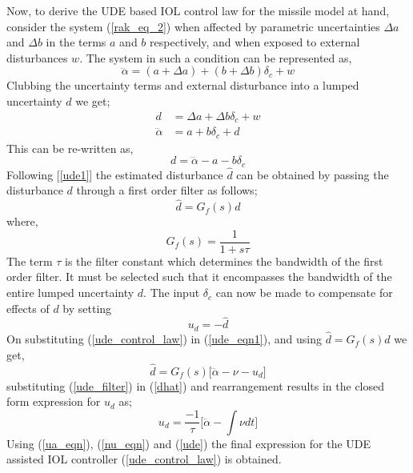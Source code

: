 \documentclass[conference]{IEEEtran}
\begin{document}
		Now, to derive the UDE based IOL control law for the missile model at hand, consider the system (\ref{rak_eq_2}) when affected by parametric uncertainties $\Delta a$ and $\Delta b$ in the terms $a$ and $b$ respectively, and when exposed to external disturbances $w$. The system in such a condition can be represented as,
		\begin{equation}
			\dddot{\alpha}=(a + \Delta a) + (b + \Delta b)\delta_c + w \nonumber
		\end{equation}
		Clubbing the uncertainty terms and external disturbance into a lumped uncertainty $d$ we get;
		\begin{equation}
			\begin{aligned}
				d &= \Delta a + \Delta b \delta_c + w \\
				\dddot{\alpha} &= a + b\delta_c + d \nonumber	
			\end{aligned}
		\end{equation}		
		This can be re-written as,
		\begin{equation}
			d=\dddot{\alpha}-a-b\delta_c \label{ude_eqn1}
		\end{equation}
		Following [\ref{ude1}] the estimated disturbance $\hat{d}$ can be obtained by passing the disturbance $d$ through a first order filter as follows;
		\begin{equation}
			\hat{d}=G_f(s)d \nonumber
		\end{equation}
		where,
		\begin{equation}
		\label{ude_filter}
			G_f(s)=\frac{1}{1+s\tau}
		\end{equation}
		The term $\tau$ is the filter constant which determines the bandwidth of the first order filter. It must be selected such that it encompasses the bandwidth of the entire lumped uncertainty $d$. The input $\delta_c$ can now be made to compensate for effects of $d$ by setting		
		\begin{equation}
		\label{ud_equals_minus_d}
			u_d = -\hat{d}
		\end{equation}
		On substituting (\ref{ude_control_law}) in (\ref{ude_eqn1}), and using $\hat{d}=G_f(s)d$ we get,
		\begin{equation}
			\hat{d}=G_f(s)\Big[\dddot{\alpha}-\nu-u_d\Big] \label{dhat}
		\end{equation}
		substituting (\ref{ude_filter}) in (\ref{dhat}) and rearrangement results in the closed form expression for $u_d$ as;
		\begin{equation}
			u_d=\frac{-1}{\tau}\Big[\ddot{\alpha}-\int{\nu dt}\Big] \label{ude}
		\end{equation}
		Using (\ref{ua_eqn}), (\ref{nu_eqn}) and (\ref{ude}) the final expression for the UDE assisted IOL controller (\ref{ude_control_law}) is obtained.
\end{document}
